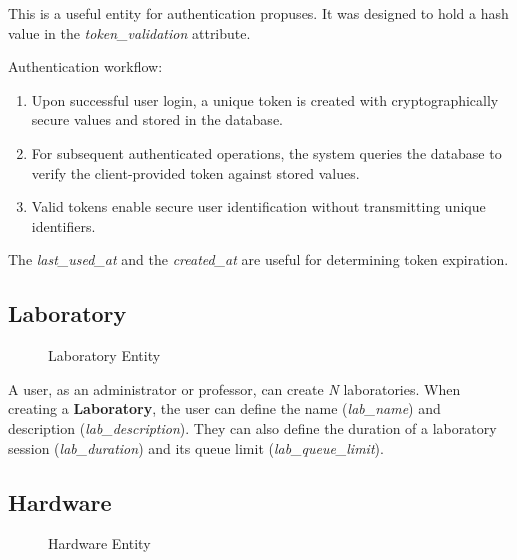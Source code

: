 This is a useful entity for authentication propuses. It was designed to hold a hash value in the \textit{token\_validation} attribute.

Authentication workflow:

\begin{enumerate}
    \item Upon successful user login, a unique token is created with cryptographically secure values and stored in the database.
    \item For subsequent authenticated operations, the system queries the database to verify the client-provided token against stored values.
    \item Valid tokens enable secure user identification without transmitting unique identifiers.
\end{enumerate}

The \textit{last\_used\_at} and the \textit{created\_at} are useful for determining token expiration.

\subsection*{Laboratory}

\begin{figure}[H]
    \begin{center}
        \resizebox{10cm}{!}{}
    \end{center}
    \caption{Laboratory Entity}
    \label{fig:laboratory_entity}
\end{figure}

A user, as an administrator or professor, can create \textit{N} laboratories. When creating a \textbf{Laboratory}, the user can define the name (\textit{lab\_name}) and description (\textit{lab\_description}). They can also define the duration of a laboratory session (\textit{lab\_duration}) and its queue limit (\textit{lab\_queue\_limit}).

\subsection*{Hardware}

\begin{figure}[H]
    \begin{center}
        \resizebox{10cm}{!}{}
    \end{center}
    \caption{Hardware Entity}
    \label{fig:hardware_entity}
\end{figure}

